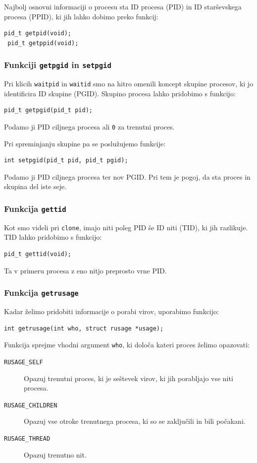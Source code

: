 \documentclass[a4paper,12pt,openright]{book}
\begin{document}
Najbolj osnovni informaciji o procesu sta ID procesa (PID) in ID starševskega procesa (PPID), ki jih lahko dobimo preko funkcij:
\begin{lstlisting}[style=func]
 pid_t getpid(void);
 pid_t getppid(void);
\end{lstlisting}

\subsubsection{Funkciji \texttt{getpgid} in \texttt{setpgid}}

Pri klicih \texttt{waitpid} in \texttt{waitid} smo na hitro omenili koncept skupine procesov, ki jo identificira ID skupine (PGID).
Skupino procesa lahko pridobimo s funkcijo:
\begin{lstlisting}[style=func]
 pid_t getpgid(pid_t pid);
\end{lstlisting}
Podamo ji PID ciljnega procesa ali \texttt{0} za trenutni proces.

Pri spreminjanju skupine pa se poslužujemo funkcije:
\begin{lstlisting}[style=func]
 int setpgid(pid_t pid, pid_t pgid);
\end{lstlisting}
Podamo ji PID ciljnega procesa ter nov PGID.
Pri tem je pogoj, da sta proces in skupina del iste seje.

\subsubsection{Funkcija \texttt{gettid}}

Kot smo videli pri \texttt{clone}, imajo niti poleg PID še ID niti (TID), ki jih razlikuje.
TID lahko pridobimo s funkcijo:
\begin{lstlisting}[style=func]
 pid_t gettid(void);
\end{lstlisting}
Ta v primeru procesa z eno nitjo preprosto vrne PID.

\subsubsection{Funkcija \texttt{getrusage}}

Kadar želimo pridobiti informacije o porabi virov, uporabimo funkcijo:
\begin{lstlisting}[style=func]
 int getrusage(int who, struct rusage *usage);
\end{lstlisting}

Funkcija sprejme vhodni argument \texttt{who}, ki določa kateri proces želimo opazovati:
\begin{description}
	\item[\texttt{RUSAGE\_SELF}] Opazuj trenutni proces, ki je seštevek virov, ki jih porabljajo vse niti procesa.
	\item[\texttt{RUSAGE\_CHILDREN}] Opazuj vse otroke trenutnega procesa, ki so se zaključili in bili počakani.
	\item[\texttt{RUSAGE\_THREAD}] Opazuj trenutno nit.
\end{description}
\end{document}
